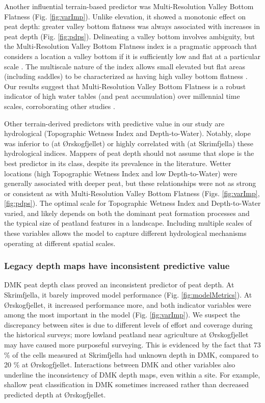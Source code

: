 \documentclass[soil, manuscript]{copernicus}
\begin{document}
Another influential terrain-based predictor was Multi-Resolution Valley Bottom Flatness (Fig. \ref{fig:varImp}).
Unlike elevation, it showed a monotonic effect on peat depth: greater valley bottom flatness was always associated with increases in peat depth (Fig. \ref{fig:pdps}).
Delineating a valley bottom involves ambiguity, but the Multi-Resolution Valley Bottom Flatness index is a pragmatic approach that considers a location a valley bottom if it is sufficiently low and flat at a particular scale \citep{gallantMultiresolutionIndexValley2003}.
The multiscale nature of the index allows small elevated but flat areas (including saddles) to be characterized as having high valley bottom flatness \citep{gallantMultiresolutionIndexValley2003}.
Our results suggest that Multi-Resolution Valley Bottom Flatness is a robust indicator of high water tables (and peat accumulation) over millennial time scales, corroborating other studies \citep{rudiyantoOpenDigitalMapping2018, deragonMappingMaximumPeat2023}.

Other terrain-derived predictors with predictive value in our study are hydrological (Topographic Wetness Index and Depth-to-Water).
Notably, slope was inferior to (at Ørskogfjellet) or highly correlated with (at Skrimfjella) these hydrological indices.
Mappers of peat depth should not assume that slope is the best predictor in its class, despite its prevalence in the literature.
Wetter locations (high Topographic Wetness Index and low Depth-to-Water) were generally associated with deeper peat, but these relationships were not as strong or consistent as with Multi-Resolution Valley Bottom Flatness (Figs. \ref{fig:varImp}, \ref{fig:pdps}).
The optimal scale for Topographic Wetness Index and Depth-to-Water varied, and likely depends on both the dominant peat formation processes and the typical size of peatland features in a landscape.
Including multiple scales of these variables allows the model to capture different hydrological mechanisms operating at different spatial scales.

\subsubsection{Legacy depth maps have inconsistent predictive value}

DMK peat depth class proved an inconsistent predictor of peat depth.
At Skrimfjella, it barely improved model performance (Fig. \ref{fig:modelMetrics}).
At Ørskogfjellet, it increased performance more, and both indicator variables were among the most important in the model (Fig. \ref{fig:varImp}).
We suspect the discrepancy between sites is due to different levels of effort and coverage during the historical surveys; more lowland peatland near agriculture at Ørskogfjellet may have caused more purposeful surveying.
This is evidenced by the fact that 73 \% of the cells measured at Skrimfjella had unknown depth in DMK, compared to 20 \% at Ørskogfjellet.
Interactions between DMK and other variables also underline the inconsistency of DMK depth maps, even within a site.
For example, shallow peat classification in DMK sometimes increased rather than decreased predicted depth at Ørskogfjellet.
\end{document}

